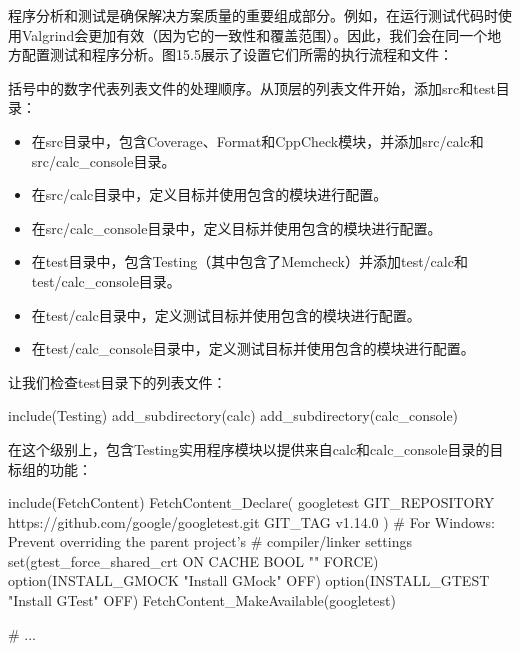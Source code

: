 
程序分析和测试是确保解决方案质量的重要组成部分。例如，在运行测试代码时使用Valgrind会更加有效（因为它的一致性和覆盖范围）。因此，我们会在同一个地方配置测试和程序分析。图15.5展示了设置它们所需的执行流程和文件：


括号中的数字代表列表文件的处理顺序。从顶层的列表文件开始，添加src和test目录：

\begin{itemize}
\item
在src目录中，包含Coverage、Format和CppCheck模块，并添加src/calc和src/calc\_console目录。

\item
在src/calc目录中，定义目标并使用包含的模块进行配置。

\item
在src/calc\_console目录中，定义目标并使用包含的模块进行配置。

\item
在test目录中，包含Testing（其中包含了Memcheck）并添加test/calc和test/calc\_console目录。

\item
在test/calc目录中，定义测试目标并使用包含的模块进行配置。

\item
在test/calc\_console目录中，定义测试目标并使用包含的模块进行配置。
\end{itemize}

让我们检查test目录下的列表文件：


\begin{cmake}
include(Testing)
add_subdirectory(calc)
add_subdirectory(calc_console)
\end{cmake}

在这个级别上，包含Testing实用程序模块以提供来自calc和calc\_console目录的目标组的功能：


\begin{cmake}
include(FetchContent)
FetchContent_Declare(
    googletest
    GIT_REPOSITORY https://github.com/google/googletest.git
    GIT_TAG v1.14.0
)
# For Windows: Prevent overriding the parent project's
# compiler/linker settings
set(gtest_force_shared_crt ON CACHE BOOL "" FORCE)
option(INSTALL_GMOCK "Install GMock" OFF)
option(INSTALL_GTEST "Install GTest" OFF)
FetchContent_MakeAvailable(googletest)

# ...
\end{cmake}


